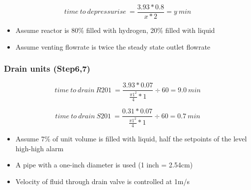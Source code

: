     \begin{equation}
        time\:to\:depressurise\:=\frac{3.93 * 0.8}{x * 2}=y\:min
    \end{equation}
    
    \begin{itemize}
        \item Assume reactor is 80\% filled with hydrogen, 20\% filled with liquid
        \item Assume venting flowrate is twice the steady state outlet flowrate
    \end{itemize}
    
 \subsubsection{Drain units (Step6,7)}   

    \begin{equation}
        time\:to\:drain\:R201\:=\frac{3.93 * 0.07}{\frac{\pi 1^2}{4} * 1} \div 60 =9.0\:min
    \end{equation}
    
    \begin{equation}
        time\:to\:drain\:S201\:=\frac{0.31 * 0.07}{\frac{\pi 1^2}{4} * 1} \div 60 =0.7\:min
    \end{equation}
    
    \begin{itemize}
        \item Assume 7\% of unit volume is filled with liquid, half the setpoints of the level high-high alarm
        \item A pipe with a one-inch diameter is used (1 inch = 2.54cm)
        \item Velocity of fluid through drain valve is controlled at 1m/s

    \end{itemize}